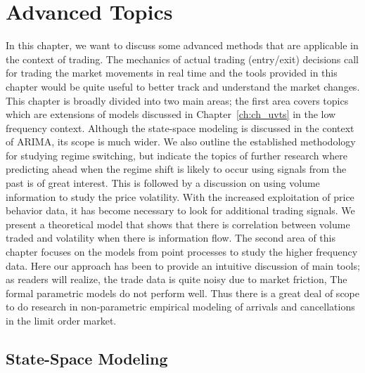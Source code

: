 \chapter{Advanced Topics\label{ch:ch_advanced}}

In this chapter, we want to discuss some advanced methods that are applicable in the context of trading. The mechanics of actual trading (entry/exit) decisions call for trading the market movements in real time and the tools provided in this chapter would be quite useful to better track and understand the market changes. This chapter is broadly divided into two main areas; the first area covers topics which are extensions of models discussed in Chapter~\ref{ch:ch_uvts} in the low frequency context. Although the state-space modeling is discussed in the context of ARIMA, its scope is much wider. We also outline the established methodology for studying regime switching, but indicate the topics of further research where predicting ahead when the regime shift is likely to occur using signals from the past is of great interest. This is followed by a discussion on using volume information to study the price volatility. With the increased exploitation of price behavior data, it has become necessary to look for additional trading signals. We present a theoretical model that shows that there is correlation between volume traded and volatility when there is information flow. The second area of this chapter focuses on the models from point processes to study the higher frequency data. Here our approach has been to provide an intuitive discussion of main tools; as readers will realize, the trade data is quite noisy due to market friction, The formal parametric models do not perform well. Thus there is a great deal of scope to do research in non-parametric empirical modeling of arrivals and cancellations in the limit order market. 



\section{State-Space Modeling\label{sec:state_space}}

